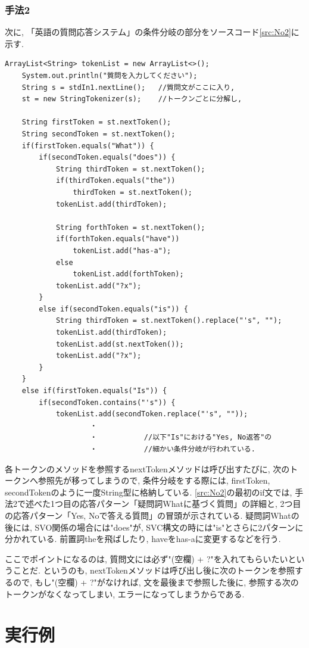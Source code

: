 \documentclass[uplatex,12pt]{jsarticle}
\begin{document}
\subsubsection{手法2}
次に, 「英語の質問応答システム」の条件分岐の部分をソースコード\ref{src:No2}に示す.
\begin{lstlisting}[caption=英語における質問応答, label=src:No2]
	ArrayList<String> tokenList = new ArrayList<>();
	System.out.println("質問を入力してください");
	String s = stdIn1.nextLine(); 	//質問文がここに入り,
	st = new StringTokenizer(s);	//トークンごとに分解し,

	String firstToken = st.nextToken();
	String secondToken = st.nextToken();
	if(firstToken.equals("What")) {
		if(secondToken.equals("does")) {
			String thirdToken = st.nextToken();
			if(thirdToken.equals("the")) 
				thirdToken = st.nextToken();
			tokenList.add(thirdToken);
	
			String forthToken = st.nextToken();
			if(forthToken.equals("have"))
				tokenList.add("has-a");
			else
				tokenList.add(forthToken);
			tokenList.add("?x");
		}
		else if(secondToken.equals("is")) {
			String thirdToken = st.nextToken().replace("'s", "");
			tokenList.add(thirdToken);
			tokenList.add(st.nextToken());
			tokenList.add("?x");
		}
	}
	else if(firstToken.equals("Is")) {
		if(secondToken.contains("'s")) {
			tokenList.add(secondToken.replace("'s", ""));
					・
					・	   		//以下"Is"における"Yes, No返答"の
					・			//細かい条件分岐が行われている.

\end{lstlisting}

各トークンのメソッドを参照するnextTokenメソッドは呼び出すたびに, 次のトークンへ参照先が移ってしまうので, 条件分岐をする際には, firstToken, secondTokenのように一度String型に格納している. \ref{src:No2}の最初のif文では, 手法2で述べた1つ目の応答パターン「疑問詞Whatに基づく質問」の詳細と, 2つ目の応答パターン「Yes, Noで答える質問」の冒頭が示されている. 疑問詞Whatの後には, SVO関係の場合には"does"が, SVC構文の時には"is"とさらに2パターンに分かれている. 前置詞theを飛ばしたり, haveをhas-aに変更するなどを行う. 

ここでポイントになるのは, 質問文には必ず"(空欄) + ?"を入れてもらいたいということだ. というのも, nextTokenメソッドは呼び出し後に次のトークンを参照するので, もし"(空欄) + ?"がなければ, 文を最後まで参照した後に, 参照する次のトークンがなくなってしまい, エラーになってしまうからである.

\section{実行例}
\end{document}
